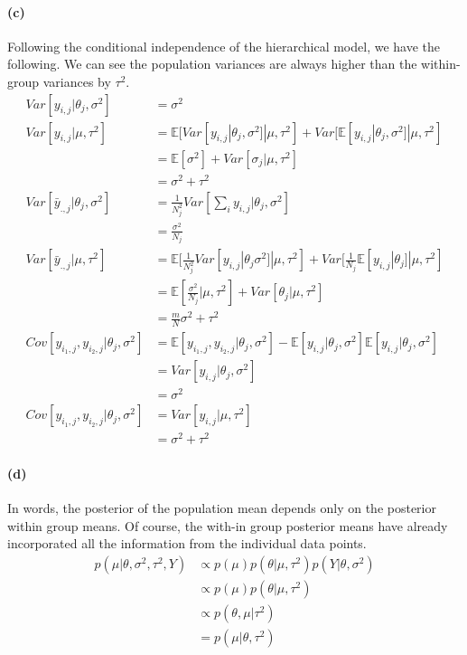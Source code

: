 \documentclass[11pt, letterpaper]{article}
\begin{document}
\paragraph{(c)}
Following the conditional independence of the hierarchical model, we have the following. We can see the population variances are always higher than the within-group variances by $\tau^2$.
\begin{align*}
    Var[y_{i,j}|\theta_j, \sigma^2] &= \sigma^2 \\
    Var[y_{i,j}|\mu, \tau^2] &= \mathbb{E}[Var[y_{i,j}|\theta_j, \sigma^2]|\mu, \tau^2] + Var[\mathbb{E}[y_{i,j}|\theta_j, \sigma^2]|\mu, \tau^2] \\
        &= \mathbb{E}[\sigma^2] + Var[\sigma_j|\mu, \tau^2] \\
        &= \sigma^2 + \tau^2 \\
    Var[\bar{y}_{.,j}|\theta_j, \sigma^2] &= \frac{1}{N_j^2} Var[\sum_i y_{i,j}|\theta_j, \sigma^2] \\
        &= \frac{\sigma^2}{N_j} \\
    Var[\bar{y}_{.,j}|\mu, \tau^2]
        &= \mathbb{E}[\frac{1}{N_j^2} Var[y_{i,j}|\theta_j \sigma^2]|\mu, \tau^2] + Var[\frac{1}{N_j} \mathbb{E}[y_{i,j}|\theta_j]|\mu, \tau^2] \\
        &= \mathbb{E}[\frac{\sigma^2}{N_j}|\mu, \tau^2] + Var[\theta_j|\mu, \tau^2] \\
        &= \frac{m}{N} \sigma^2 + \tau^2 \\
    Cov[y_{i_1, j}, y_{i_2, j}|\theta_j, \sigma^2]
        &= \mathbb{E}[y_{i_1, j}, y_{i_2, j}|\theta_j, \sigma^2] - \mathbb{E}[y_{i, j}|\theta_j, \sigma^2]\mathbb{E}[y_{i, j}|\theta_j, \sigma^2] \\
        &= Var[y_{i,j}|\theta_j, \sigma^2] \\
        &= \sigma^2 \\
    Cov[y_{i_1, j}, y_{i_2, j}|\theta_j, \sigma^2] &= Var[y_{i,j}|\mu, \tau^2] \\
        &= \sigma^2 + \tau^2
\end{align*}

\paragraph{(d)}
In words, the posterior of the population mean depends only on the posterior within group means. Of course, the with-in group posterior means have already incorporated all the information from the individual data points.
\begin{align*}
    p(\mu|\theta, \sigma^2, \tau^2, Y) &\propto p(\mu) p(\theta|\mu, \tau^2) p(Y|\theta, \sigma^2) \\
        &\propto p(\mu) p(\theta|\mu, \tau^2) \\
        &\propto p(\theta, \mu|\tau^2) \\
        &= p(\mu|\theta, \tau^2)
\end{align*}
\end{document}
